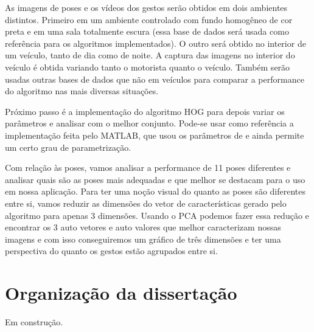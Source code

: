 As imagens de poses e os vídeos dos gestos serão obtidos em  dois ambientes distintos. Primeiro em um ambiente controlado com fundo homogêneo de cor preta e em uma sala totalmente escura (essa base de dados será usada como referência para os algoritmos implementados). O outro será obtido no interior de um veículo, tanto de dia como de noite. A captura das imagens no interior do veículo é obtida variando tanto o motorista quanto o veículo. Também serão usadas outras bases de dados que não em veículos para comparar a performance do algoritmo nas mais diversas situações.

Próximo passo é a implementação do algoritmo HOG para depois variar os parâmetros e analisar com o melhor conjunto. Pode-se usar como referência a implementação feita pelo MATLAB, que usou os parâmetros de  e ainda permite um certo grau de parametrização.

Com relação às poses, vamos analisar a performance de 11 poses diferentes e analisar quais são as poses mais adequadas e que melhor se destacam para o uso em nossa aplicação. Para ter uma noção visual do quanto as poses são diferentes entre si, vamos reduzir as dimensões do vetor de características gerado pelo algoritmo para apenas 3 dimensões. Usando o PCA podemos fazer essa redução e encontrar os 3 auto vetores e auto valores que melhor caracterizam nossas imagens e com isso conseguiremos um gráfico de três dimensões e ter uma perspectiva do quanto os gestos estão agrupados entre si.

\section{Organização da dissertação}

Em construção.

